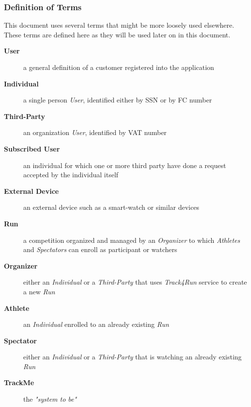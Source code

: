 \documentclass[a4paper]{article}
\begin{document}
            \subsubsection{Definition of Terms}
            This document uses several terms that might be more loosely used elsewhere. These terms are defined here as they will be used later on in this document.
                \begin{description}
                    \item[\textbf{User}] a general definition of a customer registered into the application
                    
                    \item[\textbf{Individual}] a single person \textit{User}, identified either by SSN or by FC number
                    \item[\textbf{Third-Party}] an organization \textit{User}, identified by VAT number
                    
                    \item[\textbf{Subscribed User}] an individual for which one or more third party have done a request accepted by the individual itself
                    
                    \item[\textbf{External Device}] an external device such as a smart-watch or similar devices
                    
                    \item[\textbf{Run}] a competition organized and managed by an \textit{Organizer} to which \textit{Athletes} and \textit{Spectators} can enroll as participant or watchers
                    
                    \item[\textbf{Organizer}] either an \textit{Individual} or a \textit{Third-Party} that uses \textit{Track4Run} service to create a new \textit{Run}
                    
                    \item[\textbf{Athlete}] an \textit{Individual} enrolled to an already existing \textit{Run}
                    
                    \item[\textbf{Spectator}] either an \textit{Individual} or a \textit{Third-Party} that is watching an already existing \textit{Run}
                    
                    \item[\textbf{TrackMe}] the \textit{"system to be"}
                    

\end{description}
\end{document}
